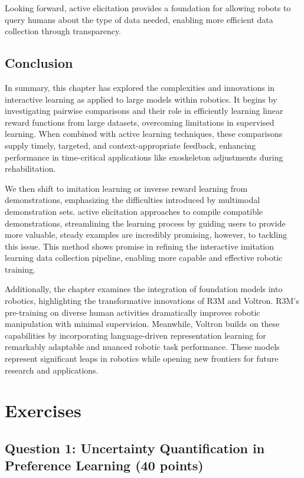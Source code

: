 \documentclass[
  letterpaper,
  numbers=noenddot,
  DIV=11]{scrreprt}
\theoremstyle{definition}
\theoremstyle{plain}
\theoremstyle{plain}
\theoremstyle{remark}
\begin{document}
Looking forward, active elicitation provides a foundation for allowing
robots to query humans about the type of data needed, enabling more
efficient data collection through transparency.

\subsection{Conclusion}\label{conclusion}

In summary, this chapter has explored the complexities and innovations
in interactive learning as applied to large models within robotics. It
begins by investigating pairwise comparisons and their role in
efficiently learning linear reward functions from large datasets,
overcoming limitations in supervised learning. When combined with active
learning techniques, these comparisons supply timely, targeted, and
context-appropriate feedback, enhancing performance in time-critical
applications like exoskeleton adjustments during rehabilitation.

We then shift to imitation learning or inverse reward learning from
demonstrations, emphasizing the difficulties introduced by multimodal
demonstration sets. active elicitation approaches to compile compatible
demonstrations, streamlining the learning process by guiding users to
provide more valuable, steady examples are incredibly promising,
however, to tackling this issue. This method shows promise in refining
the interactive imitation learning data collection pipeline, enabling
more capable and effective robotic training.

Additionally, the chapter examines the integration of foundation models
into robotics, highlighting the transformative innovations of R3M and
Voltron. R3M's pre-training on diverse human activities dramatically
improves robotic manipulation with minimal supervision. Meanwhile,
Voltron builds on these capabilities by incorporating language-driven
representation learning for remarkably adaptable and nuanced robotic
task performance. These models represent significant leaps in robotics
while opening new frontiers for future research and applications.

\section{Exercises}\label{exercises-1}

\subsection*{Question 1: Uncertainty Quantification in Preference
Learning (40
points)}\label{sec-question-1-uncertainty-quantification-in-preference-learning-40-points}
\end{document}
